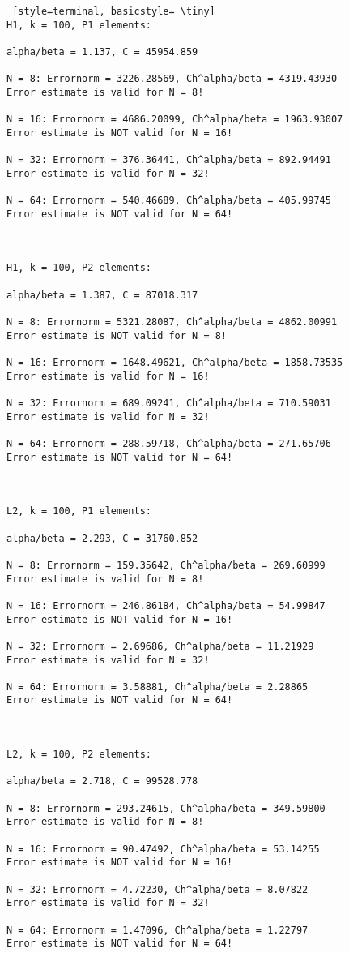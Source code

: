 \documentclass[a4paper,english,12pt,twoside]{article}
\begin{document}
\newpage
\begin{lstlisting} [style=terminal, basicstyle= \tiny]
H1, k = 100, P1 elements:

alpha/beta = 1.137, C = 45954.859

N = 8: Errornorm = 3226.28569, Ch^alpha/beta = 4319.43930
Error estimate is valid for N = 8!

N = 16: Errornorm = 4686.20099, Ch^alpha/beta = 1963.93007
Error estimate is NOT valid for N = 16!

N = 32: Errornorm = 376.36441, Ch^alpha/beta = 892.94491
Error estimate is valid for N = 32!

N = 64: Errornorm = 540.46689, Ch^alpha/beta = 405.99745
Error estimate is NOT valid for N = 64!



H1, k = 100, P2 elements:

alpha/beta = 1.387, C = 87018.317

N = 8: Errornorm = 5321.28087, Ch^alpha/beta = 4862.00991
Error estimate is NOT valid for N = 8!

N = 16: Errornorm = 1648.49621, Ch^alpha/beta = 1858.73535
Error estimate is valid for N = 16!

N = 32: Errornorm = 689.09241, Ch^alpha/beta = 710.59031
Error estimate is valid for N = 32!

N = 64: Errornorm = 288.59718, Ch^alpha/beta = 271.65706
Error estimate is NOT valid for N = 64!



L2, k = 100, P1 elements:

alpha/beta = 2.293, C = 31760.852

N = 8: Errornorm = 159.35642, Ch^alpha/beta = 269.60999
Error estimate is valid for N = 8!

N = 16: Errornorm = 246.86184, Ch^alpha/beta = 54.99847
Error estimate is NOT valid for N = 16!

N = 32: Errornorm = 2.69686, Ch^alpha/beta = 11.21929
Error estimate is valid for N = 32!

N = 64: Errornorm = 3.58881, Ch^alpha/beta = 2.28865
Error estimate is NOT valid for N = 64!



L2, k = 100, P2 elements:

alpha/beta = 2.718, C = 99528.778

N = 8: Errornorm = 293.24615, Ch^alpha/beta = 349.59800
Error estimate is valid for N = 8!

N = 16: Errornorm = 90.47492, Ch^alpha/beta = 53.14255
Error estimate is NOT valid for N = 16!

N = 32: Errornorm = 4.72230, Ch^alpha/beta = 8.07822
Error estimate is valid for N = 32!

N = 64: Errornorm = 1.47096, Ch^alpha/beta = 1.22797
Error estimate is NOT valid for N = 64!
\end{lstlisting}
\end{document}
